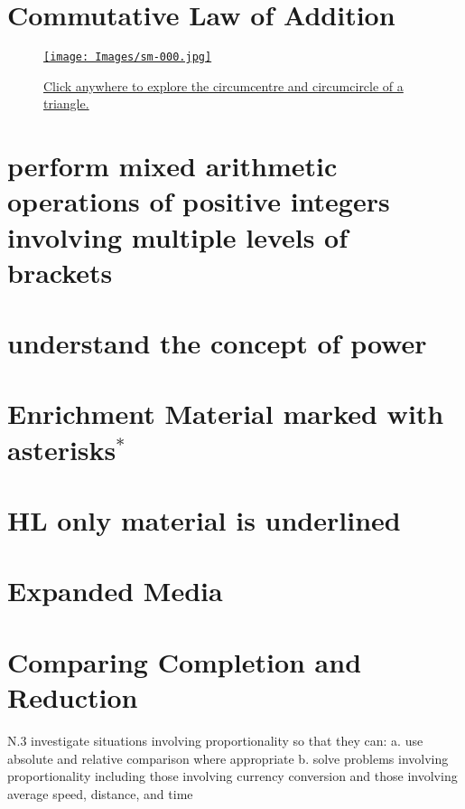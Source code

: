 \section{Commutative Law of Addition}
\begin{figure}%
    \centering
    \href{https://www.geogebra.org/m/CsDdkudm}{\texttt{[image: Images/sm-000.jpg]}}
    \caption{\href{https://www.mathopenref.com/trianglecircumcircle.html}{Click anywhere to explore the circumcentre and circumcircle of a triangle.}}
\end{figure}



\section{perform mixed arithmetic operations of positive
integers involving multiple levels of brackets}












\section{understand the concept of power}




\section{Enrichment Material marked with asterisks$^*$}

\section{HL only material is underlined}



\section{Expanded Media}


\section{Comparing Completion and Reduction}
N.3 investigate situations involving proportionality so that they can:
a. use absolute and relative comparison where appropriate
b. solve problems involving proportionality including those involving currency conversion
and those involving average speed, distance, and time